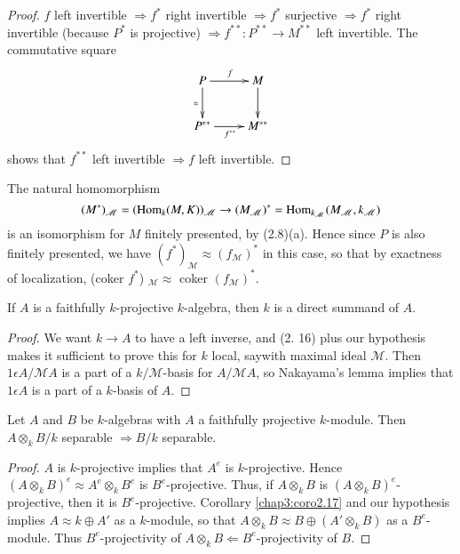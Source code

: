   \begin{proof}%
$f$ left invertible $\Rightarrow f^*$ right invertible $\Rightarrow f^*$
    surjective $\Rightarrow f^*$ right invertible (because $P^*$ is
    projective) $\Rightarrow f^{**}: P^{**} \to M^{**}$ left
    invertible. The commutative square 
\[
\xymatrix{
P \ar[r]^f \ar[d]_{\approx} & M \ar[d] \\
P^{\ast\ast} \ar[r]_{f^{\ast\ast}} & M^{\ast\ast}
}
\]
 shows that $f^{**}$ left invertible $\Rightarrow f$ left invertible.  
  \end{proof}   
  
  The natural homomorphism
  $$
  (M^*)_{\mathscr{M}} =  ( \operatorname{Hom}_k (M,K))_\mathscr{M} \to
  (M_\mathscr{M})^* = \operatorname{Hom}_{k_{\mathscr{M}}} (M_\mathscr{M}, 
  k_\mathscr{M}) 
  $$
  is an isomorphism for $M$ finitely presented, by (2.8)(a). Hence
  since $P$ is also finitely presented, we have  $(f^*)_{\mathscr{M}}
  \approx (f_{\mathscr{M}})^*$ in this case, so that by exactness of
  localization, (coker $f^*$) $_{\mathscr{M}} \approx$ coker
  $(f_\mathscr{M})^*$. 

\setcounter{coro}{16}
  \begin{coro}\label{chap3:coro2.17}  %
If $A$ is a faithfully $k$-projective $k$-algebra, then $k$ is a
direct summand of $A$. 
  \end{coro}  

  \begin{proof}%
We want $k \to A$ to have a left inverse, and (2. 16) plus our
hypothesis makes it sufficient to prove this for $k$ local,
say\pageoriginale with 
maximal ideal $\mathscr{M}$. Then $1 \epsilon A/ \mathscr{M} A$ is a
part of a $k /\mathscr{M}$-basis for  $A/ \mathscr{M}A$, so Nakayama's
lemma implies that $1 \epsilon A$ is a part of a $k$-basis of $A$. 
  \end{proof}  

\setcounter{prop}{17}
  \begin{prop}\label{chap3:prop2.18} %
Let $A$ and $B$ be $k$-algebras with $A$ a faithfully projective
$k$-module. Then $A \otimes_k B /k$ separable $\Rightarrow B/ k$
separable. 
  \end{prop}

  \begin{proof}%
$A$ is $k$-projective implies that $A^e$ is $k$-projective. Hence $(A
    \otimes_k B)^e \approx A^e \otimes_k B^e$ is
    $B^e$-projective. Thus, if $A \otimes_k B$ is $(A \otimes_k
    B)^e$-projective, then it is $B^e$-projective. Corollary
    \ref{chap3:coro2.17} and 
    our hypothesis implies $A \approx k \oplus A'$ as a $k$-module, so
    that $A \otimes_k B \approx B \oplus (A' \otimes_k B)$ as a
    $B^e$-module. Thus $B^e$-projectivity of $A \otimes_k B \Leftarrow
    B^e$-projectivity of $B$.  
    \end{proof}    

